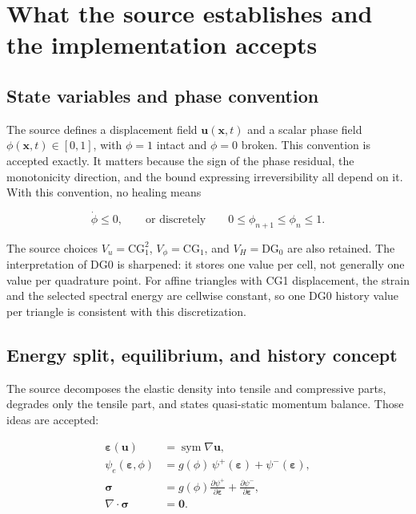 \documentclass[11pt,a4paper]{article}
\begin{document}
\section{What the source establishes and the implementation accepts}

\subsection{State variables and phase convention}

The source defines a displacement field $\boldsymbol{u}(\boldsymbol{x},t)$ and
a scalar phase field $\phi(\boldsymbol{x},t)\in[0,1]$, with $\phi=1$ intact and
$\phi=0$ broken. This convention is accepted exactly. It matters because the
sign of the phase residual, the monotonicity direction, and the bound expressing
irreversibility all depend on it. With this convention, no healing means

\begin{equation}
  \dot{\phi}\le 0,
  \qquad\text{or discretely}\qquad
  0\le \phi_{n+1}\le \phi_n\le 1.
  \label{eq:irreversibility}
\end{equation}

The source choices $V_u=\mathrm{CG}_1^2$, $V_\phi=\mathrm{CG}_1$, and
$V_H=\mathrm{DG}_0$ are also retained. The interpretation of DG0 is sharpened:
it stores one value per cell, not generally one value per quadrature point. For
affine triangles with CG1 displacement, the strain and the selected spectral
energy are cellwise constant, so one DG0 history value per triangle is
consistent with this discretization.

\subsection{Energy split, equilibrium, and history concept}

The source decomposes the elastic density into tensile and compressive parts,
degrades only the tensile part, and states quasi-static momentum balance. Those
ideas are accepted:

\begin{align}
  \boldsymbol{\varepsilon}(\boldsymbol{u})
    &= \operatorname{sym}\nabla\boldsymbol{u}, \\
  \psi_e(\boldsymbol{\varepsilon},\phi)
    &= g(\phi)\,\psi^+(\boldsymbol{\varepsilon})
       +\psi^-(\boldsymbol{\varepsilon}), \\
  \boldsymbol{\sigma}
    &= g(\phi)\frac{\partial\psi^+}{\partial\boldsymbol{\varepsilon}}
       +\frac{\partial\psi^-}{\partial\boldsymbol{\varepsilon}}, \\
  \nabla\!\cdot\boldsymbol{\sigma}&=\boldsymbol{0}.
  \label{eq:mechanics}
\end{align}
\end{document}
